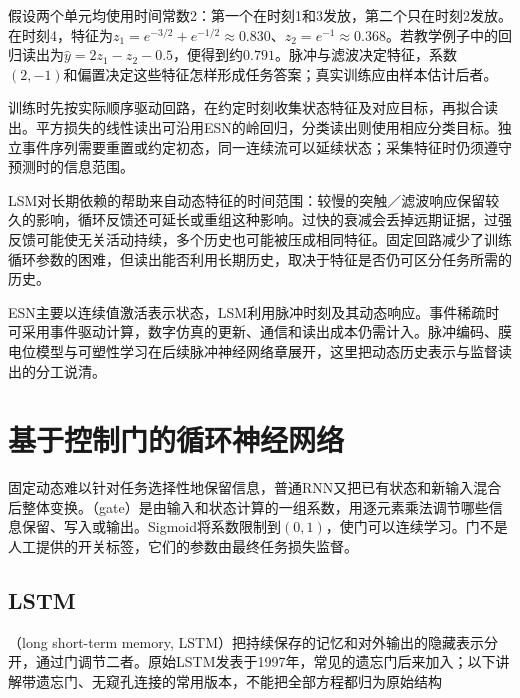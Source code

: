 \begin{example}[从脉冲活动到预测]
  \label{ex:rnn-lsm-readout}
  假设两个单元均使用时间常数2：第一个在时刻1和3发放，第二个只在时刻2发放。在时刻4，特征为$z_1=e^{-3/2}+e^{-1/2}\approx0.830$、$z_2=e^{-1}\approx0.368$。若教学例子中的回归读出为$\widehat y=2z_1-z_2-0.5$，便得到约$0.791$。脉冲与滤波决定特征，系数$(2,-1)$和偏置决定这些特征怎样形成任务答案；真实训练应由样本估计后者。
\end{example}

训练时先按实际顺序驱动回路，在约定时刻收集状态特征及对应目标，再拟合读出。平方损失的线性读出可沿用ESN的岭回归，分类读出则使用相应分类目标。独立事件序列需要重置或约定初态，同一连续流可以延续状态；采集特征时仍须遵守预测时的信息范围。

LSM对长期依赖的帮助来自动态特征的时间范围：较慢的突触／滤波响应保留较久的影响，循环反馈还可延长或重组这种影响。过快的衰减会丢掉远期证据，过强反馈可能使无关活动持续，多个历史也可能被压成相同特征。固定回路减少了训练循环参数的困难，但读出能否利用长期历史，取决于特征是否仍可区分任务所需的历史。

ESN主要以连续值激活表示状态，LSM利用脉冲时刻及其动态响应。事件稀疏时可采用事件驱动计算，数字仿真的更新、通信和读出成本仍需计入。脉冲编码、膜电位模型与可塑性学习在后续脉冲神经网络章展开，这里把动态历史表示与监督读出的分工说清。

\section{基于控制门的循环神经网络}
\label{sec:rnn-gated}

固定动态难以针对任务选择性地保留信息，普通RNN又把已有状态和新输入混合后整体变换。（gate）是由输入和状态计算的一组系数，用逐元素乘法调节哪些信息保留、写入或输出。Sigmoid将系数限制到$(0,1)$，使门可以连续学习。门不是人工提供的开关标签，它们的参数由最终任务损失监督。

\subsection{LSTM}
\label{sec:rnn-lstm}

（long short-term memory, LSTM）把持续保存的记忆和对外输出的隐藏表示分开，通过门调节二者。原始LSTM发表于1997年，常见的遗忘门后来加入；以下讲解带遗忘门、无窥孔连接的常用版本，不能把全部方程都归为原始结构

